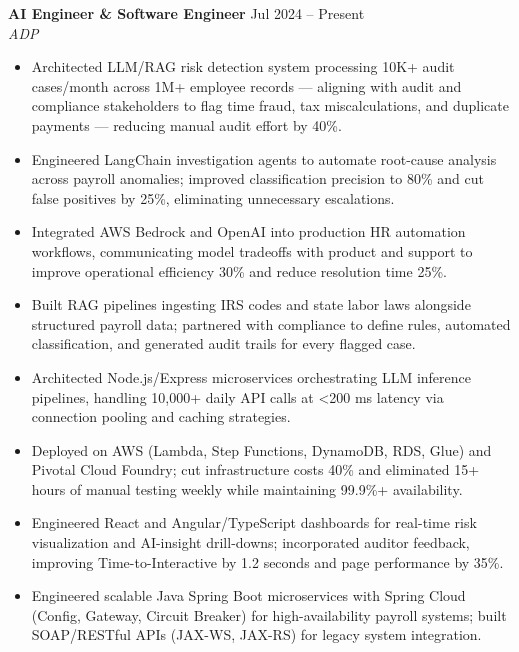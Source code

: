 \documentclass[10pt,letterpaper]{article}
\newcommand{\entry}[3]{%
  \vspace{3pt}\textbf{#1} \hfill #3 \\
  \textit{\small #2}\vspace{1pt}}
\begin{document}
\entry{AI Engineer \& Software Engineer}{ADP}{Jul 2024 -- Present}
\begin{itemize}
  \item Architected LLM/RAG risk detection system processing 10K+ audit cases/month across 1M+ employee records --- aligning with audit and compliance stakeholders to flag time fraud, tax miscalculations, and duplicate payments --- reducing manual audit effort by 40\%.
  \item Engineered LangChain investigation agents to automate root-cause analysis across payroll anomalies; improved classification precision to 80\% and cut false positives by 25\%, eliminating unnecessary escalations.
  \item Integrated AWS Bedrock and OpenAI into production HR automation workflows, communicating model tradeoffs with product and support to improve operational efficiency 30\% and reduce resolution time 25\%.
  \item Built RAG pipelines ingesting IRS codes and state labor laws alongside structured payroll data; partnered with compliance to define rules, automated classification, and generated audit trails for every flagged case.
  \item Architected Node.js/Express microservices orchestrating LLM inference pipelines, handling 10,000+ daily API calls at \textless{}200 ms latency via connection pooling and caching strategies.
  \item Deployed on AWS (Lambda, Step Functions, DynamoDB, RDS, Glue) and Pivotal Cloud Foundry; cut infrastructure costs 40\% and eliminated 15+ hours of manual testing weekly while maintaining 99.9\%+ availability.
  \item Engineered React and Angular/TypeScript dashboards for real-time risk visualization and AI-insight drill-downs; incorporated auditor feedback, improving Time-to-Interactive by 1.2 seconds and page performance by 35\%.
  \item Engineered scalable Java Spring Boot microservices with Spring Cloud (Config, Gateway, Circuit Breaker) for high-availability payroll systems; built SOAP/RESTful APIs (JAX-WS, JAX-RS) for legacy system integration.
\end{itemize}
\end{document}
